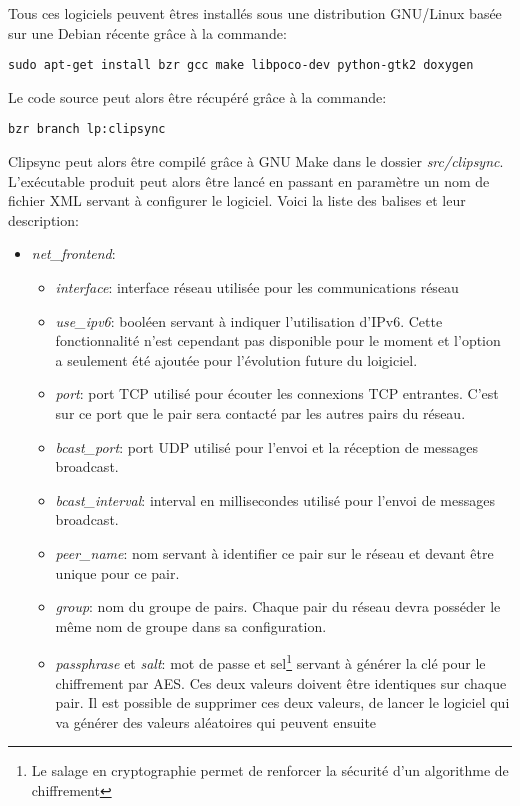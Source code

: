 Tous ces logiciels peuvent êtres installés sous une distribution GNU/Linux
basée sur une Debian récente grâce à la commande:
\begin{verbatim}
sudo apt-get install bzr gcc make libpoco-dev python-gtk2 doxygen
\end{verbatim}
Le code source peut alors être récupéré grâce à la commande:
\begin{verbatim}
bzr branch lp:clipsync
\end{verbatim}
Clipsync peut alors être compilé grâce à GNU Make dans le dossier
\emph{src/clipsync}.
L'exécutable produit peut alors être lancé en passant en paramètre un nom
de fichier XML servant à configurer le logiciel. Voici la liste des balises
et leur description:
\begin{itemize}
\item \emph{net\_frontend}:
  \begin{itemize}
  \item \emph{interface}: interface réseau utilisée pour les communications
    réseau
  \item \emph{use\_ipv6}: booléen servant à indiquer l'utilisation d'IPv6.
    Cette fonctionnalité n'est cependant pas disponible pour le moment et
    l'option a seulement été ajoutée pour l'évolution future du loigiciel.
  \item \emph{port}: port TCP utilisé pour écouter les connexions TCP
    entrantes. C'est sur ce port que le pair sera contacté par les autres
    pairs du réseau.
  \item \emph{bcast\_port}: port UDP utilisé pour l'envoi et la réception de
    messages broadcast.
  \item \emph{bcast\_interval}: interval en millisecondes utilisé pour l'envoi
    de messages broadcast.
  \item \emph{peer\_name}: nom servant à identifier ce pair sur le réseau et
    devant être unique pour ce pair.
  \item \emph{group}: nom du groupe de pairs. Chaque pair du réseau devra
    posséder le même nom de groupe dans sa configuration.
  \item \emph{passphrase} et \emph{salt}: mot de passe et sel\footnote{Le
      salage en cryptographie permet de renforcer la sécurité d'un algorithme
      de chiffrement\cite{schneier-crypto}} servant à générer la clé pour le
    chiffrement par AES. Ces deux valeurs doivent être identiques sur chaque
    pair. Il est possible de supprimer ces deux valeurs, de lancer le
    logiciel qui va générer des valeurs aléatoires qui peuvent ensuite

\end{itemize}
\end{itemize}
